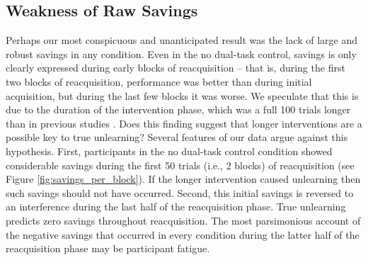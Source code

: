 \documentclass[man,apacite,draftfirst]{apa6} \usepackage{amsmath}
\begin{document}
\subsection*{Weakness of Raw Savings} Perhaps our most conspicuous and
unanticipated result was the lack of large and robust savings in any condition.
Even in the no dual-task control, savings is only clearly expressed during early
blocks of reacquisition -- that is, during the first two blocks of
reacquisition, performance was better than during initial acquisition, but
during the last few blocks it was worse. We speculate that this is due to the
duration of the intervention phase, which was a full 100 trials longer than in
previous studies \cite{crossley_erasing_2013, CrossleyAshbyMaddox2014}. Does
this finding suggest that longer interventions are a possible key to true
unlearning? Several features of our data argue against this hypothesis. First,
participants in the no dual-task control condition showed considerable savings
during the first 50 trials (i.e., 2 blocks) of reacquisition (see Figure
\ref{fig:savings_per_block}). If the longer intervention caused unlearning then
such savings should not have occurred. Second, this initial savings is reversed
to an interference during the last half of the reacquisition phase. True
unlearning predicts zero savings throughout reacquisition. The most parsimonious
account of the negative savings that occurred in every condition during the
latter half of the reacquisition phase may be participant fatigue.
\end{document}
